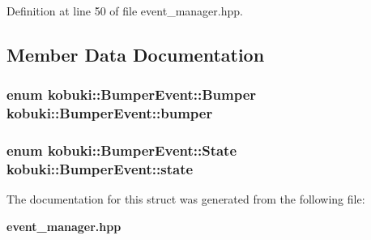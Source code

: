 \-Definition at line 50 of file event\-\_\-manager.\-hpp.



\subsection{\-Member \-Data \-Documentation}
\subsubsection[{bumper}]{\setlength{\rightskip}{0pt plus 5cm}enum {\bf kobuki\-::\-Bumper\-Event\-::\-Bumper}  {\bf kobuki\-::\-Bumper\-Event\-::bumper}}\label{structkobuki_1_1BumperEvent_af5950bf85bfbc384d36461e62848ba55}
\subsubsection[{state}]{\setlength{\rightskip}{0pt plus 5cm}enum {\bf kobuki\-::\-Bumper\-Event\-::\-State}  {\bf kobuki\-::\-Bumper\-Event\-::state}}\label{structkobuki_1_1BumperEvent_a6bb2ddaebf68b76924481952ccd8e732}


\-The documentation for this struct was generated from the following file\-:\begin{DoxyCompactItemize}
\item 
{\bf event\-\_\-manager.\-hpp}\end{DoxyCompactItemize}
